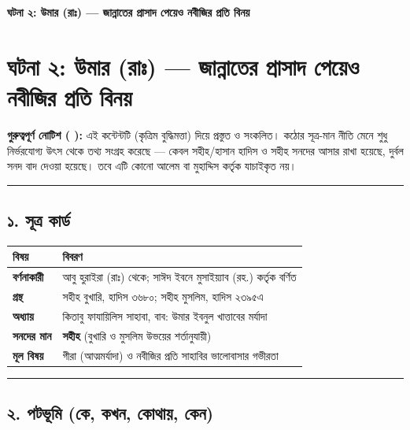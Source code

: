 

\begin{center}{\Large\bfseries\color{emerald} ঘটনা ২: উমার (রাঃ) — জান্নাতের প্রাসাদ পেয়েও নবীজির প্রতি বিনয়}\end{center}
\vspace{1em}
\section*{ঘটনা ২: উমার (রাঃ) — জান্নাতের প্রাসাদ পেয়েও নবীজির প্রতি বিনয়}

\begin{warnbox}
 \textbf{গুরুত্বপূর্ণ নোটিশ ( ):} এই কন্টেন্টটি  (কৃত্রিম বুদ্ধিমত্তা) দিয়ে প্রস্তুত ও সংকলিত।  কঠোর সূত্র-মান নীতি মেনে শুধু নির্ভরযোগ্য উৎস থেকে তথ্য সংগ্রহ করেছে — কেবল সহীহ/হাসান হাদিস ও সহীহ সনদের আসার রাখা হয়েছে, দুর্বল সনদ বাদ দেওয়া হয়েছে। তবে এটি কোনো আলেম বা মুহাদ্দিস কর্তৃক যাচাইকৃত নয়।
\end{warnbox}


\medskip\hrule\medskip

\subsection*{১. সূত্র কার্ড}

\begin{table}[h]\centering\small
\begin{tabular}{ll}
বিষয় & বিবরণ \\
\hline
\textbf{বর্ণনাকারী} & আবু হুরাইরা (রাঃ) থেকে; সাঈদ ইবনে মুসাইয়্যাব (রহ.) কর্তৃক বর্ণিত \\
\textbf{গ্রন্থ} & সহীহ বুখারি, হাদিস ৩৬৮০; সহীহ মুসলিম, হাদিস ২৩৯৫এ \\
\textbf{অধ্যায়} & কিতাবু ফাযায়িলিস সাহাবা, বাব: উমার ইবনুল খাত্তাবের মর্যাদা \\
\textbf{সনদের মান} & \textbf{সহীহ} (বুখারি ও মুসলিম উভয়ের শর্তানুযায়ী) \\
\textbf{মূল বিষয়} & গীরা (আত্মমর্যাদা) ও নবীজির প্রতি সাহাবির ভালোবাসার গভীরতা \\
\hline
\end{tabular}
\end{table}

\medskip\hrule\medskip

\subsection*{২. পটভূমি (কে, কখন, কোথায়, কেন)}

